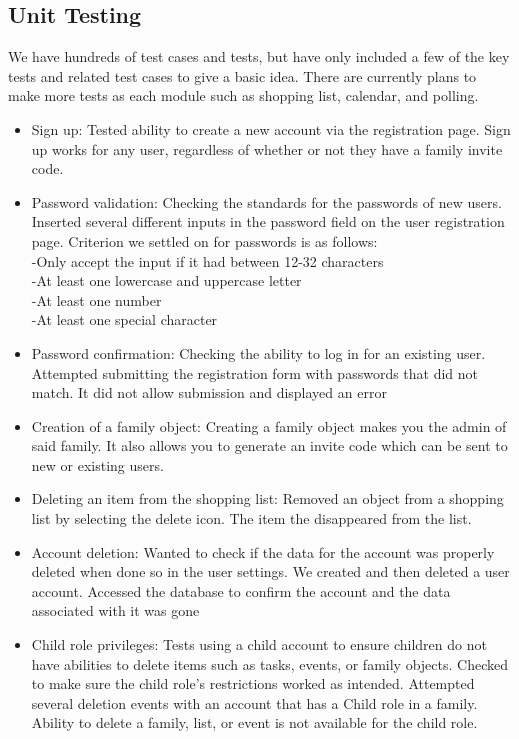 \documentclass[12pt]{article}
\begin{document}
\subsection{Unit Testing}
    We have hundreds of test cases and tests, but have only included a few of the key tests and related test cases to give a basic idea. There are currently plans to make more tests as each module such as shopping list, calendar, and polling.
\begin{itemize}
    \item Sign up: Tested ability to create a new account via the registration page. Sign up works for any user, regardless of whether or not they have a family invite code. 
    \item Password validation: Checking the standards for the passwords of new users. Inserted several different inputs in the password field on the user registration page. Criterion we settled on for passwords is as follows: \\
    -Only accept the input if it had between 12-32 characters \\
    -At least one lowercase and uppercase letter \\
    -At least one number \\
    -At least one special character 
    \item Password confirmation: Checking the ability to log in for an existing user. Attempted submitting the registration form with passwords that did not match. It did not allow submission and displayed an error
    \item Creation of a family object: Creating a family object makes you the admin of said family. It also allows you to generate an invite code which can be sent to new or existing users. 
    \item Deleting an item from the shopping list: Removed an object from a shopping list by selecting the delete icon. The item the disappeared from the list.
    \item Account deletion: Wanted to check if the data for the account was properly deleted when done so in the user settings. We created and then deleted a user account. Accessed the database to confirm the account and the data associated with it was gone
    \item Child role privileges: Tests using a child account to ensure children do not have abilities to delete items such as tasks, events, or family objects. Checked to make sure the child role’s restrictions worked as intended. Attempted several deletion events with an account that has a Child role in a family. Ability to delete a family, list, or event is not available for the child role.

\end{itemize}
\end{document}
